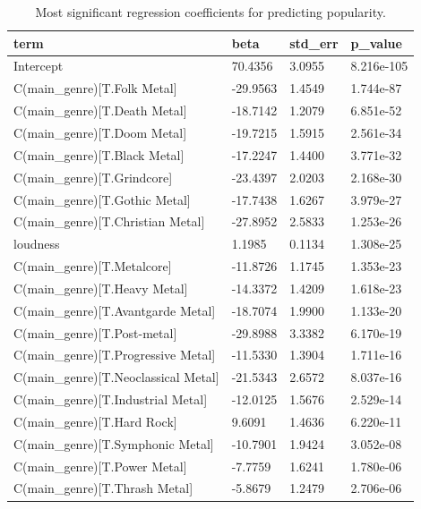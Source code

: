 \begin{table}[t]
\centering
\caption{Most significant regression coefficients for predicting popularity.}
\label{tab:regression\_top}
\begin{tabular}{|l|l|l|l|}
\hline
term & beta & std\_err & p\_value \\ \hline
Intercept & 70.4356 & 3.0955 & 8.216e-105 \\
C(main\_genre)[T.Folk Metal] & -29.9563 & 1.4549 & 1.744e-87 \\
C(main\_genre)[T.Death Metal] & -18.7142 & 1.2079 & 6.851e-52 \\
C(main\_genre)[T.Doom Metal] & -19.7215 & 1.5915 & 2.561e-34 \\
C(main\_genre)[T.Black Metal] & -17.2247 & 1.4400 & 3.771e-32 \\
C(main\_genre)[T.Grindcore] & -23.4397 & 2.0203 & 2.168e-30 \\
C(main\_genre)[T.Gothic Metal] & -17.7438 & 1.6267 & 3.979e-27 \\
C(main\_genre)[T.Christian Metal] & -27.8952 & 2.5833 & 1.253e-26 \\
loudness & 1.1985 & 0.1134 & 1.308e-25 \\
C(main\_genre)[T.Metalcore] & -11.8726 & 1.1745 & 1.353e-23 \\
C(main\_genre)[T.Heavy Metal] & -14.3372 & 1.4209 & 1.618e-23 \\
C(main\_genre)[T.Avantgarde Metal] & -18.7074 & 1.9900 & 1.133e-20 \\
C(main\_genre)[T.Post-metal] & -29.8988 & 3.3382 & 6.170e-19 \\
C(main\_genre)[T.Progressive Metal] & -11.5330 & 1.3904 & 1.711e-16 \\
C(main\_genre)[T.Neoclassical Metal] & -21.5343 & 2.6572 & 8.037e-16 \\
C(main\_genre)[T.Industrial Metal] & -12.0125 & 1.5676 & 2.529e-14 \\
C(main\_genre)[T.Hard Rock] & 9.6091 & 1.4636 & 6.220e-11 \\
C(main\_genre)[T.Symphonic Metal] & -10.7901 & 1.9424 & 3.052e-08 \\
C(main\_genre)[T.Power Metal] & -7.7759 & 1.6241 & 1.780e-06 \\
C(main\_genre)[T.Thrash Metal] & -5.8679 & 1.2479 & 2.706e-06 \\
\hline
\end{tabular}
\end{table}